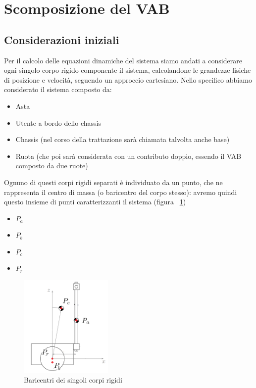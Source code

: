 \section{Scomposizione del VAB}
\subsection{Considerazioni iniziali}
Per il calcolo delle equazioni dinamiche del sistema siamo andati a considerare ogni singolo corpo rigido componente il sistema, calcolandone le grandezze fisiche di posizione e velocità, seguendo un approccio cartesiano. 
Nello specifico abbiamo considerato il sistema composto da:
\begin{itemize}
	\item Asta
	\item Utente a bordo dello chassis
	\item Chassis (nel corso della trattazione sarà chiamata talvolta anche base)
	\item Ruota (che poi sarà considerata con un contributo doppio, essendo il VAB composto da due ruote)
\end{itemize}

Ognuno di questi corpi rigidi separati è individuato da un punto, che ne rappresenta il centro di massa (o baricentro del corpo stesso): avremo quindi questo insieme di punti caratterizzanti il sistema (figura ~\ref{fig:VAB_baricentri})

\begin{itemize}
	\item \textbf{$P_a$}
	\item \textbf{$P_b$}
	\item \textbf{$P_c$}
	\item \textbf{$P_r$}
\end{itemize}

\begin{figure}[H]
	\centering   	
	\includegraphics[width=0.4\textwidth]{Immagini/VAB_baricentrum.png}
	\caption{Baricentri dei singoli corpi rigidi}
	\label{fig:VAB_baricentri}
\end{figure} 

